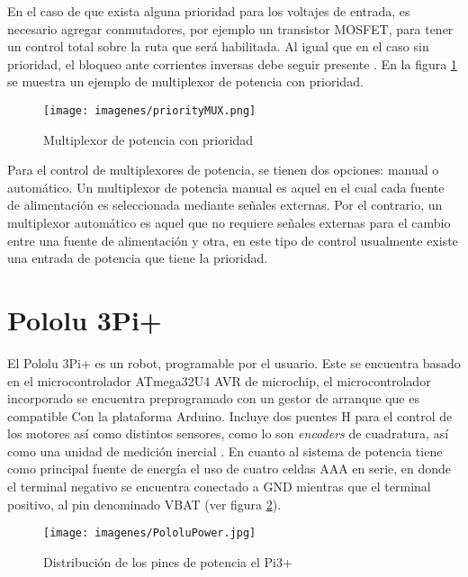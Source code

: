 En el caso de que exista alguna prioridad para los voltajes de entrada, es necesario agregar conmutadores,
por ejemplo un transistor MOSFET, para tener un control total sobre la ruta que será habilitada. Al igual que
en el caso sin prioridad, el bloqueo ante corrientes inversas debe seguir presente \cite{triano_basics_2020}. En la figura \ref{fig:priorityMux} se muestra un ejemplo de multiplexor de potencia con prioridad.

\begin{figure}[H]
    \centering
    \texttt{[image: imagenes/priorityMUX.png]}
    \caption{Multiplexor de potencia con prioridad \cite{triano_basics_2020}}
    \label{fig:priorityMux}
\end{figure}

Para el control de multiplexores de potencia, se tienen dos opciones: manual o automático. Un multiplexor de
potencia manual es aquel en el cual cada fuente de alimentación es seleccionada mediante señales externas. Por el contrario, un multiplexor automático es aquel que no requiere señales externas para el cambio entre 
una fuente de alimentación y otra, en este tipo de control usualmente existe una entrada de potencia que 
tiene la prioridad.

\section{Pololu 3Pi+}

El Pololu 3Pi+ es un robot, programable por el usuario. Este se encuentra basado en el microcontrolador ATmega32U4 AVR
de microchip, el microcontrolador incorporado se encuentra preprogramado con un gestor de arranque que es compatible
 Con la plataforma Arduino. Incluye dos puentes H para el control de los motores así como distintos sensores, como lo 
 son \textit{encoders} de cuadratura, así como una unidad de medición inercial \cite{noauthor_pololu_nodate}. En cuanto 
 al sistema de potencia tiene como principal fuente de energía el uso de cuatro celdas AAA en serie, en donde el 
 terminal negativo se encuentra conectado a GND mientras que el terminal positivo, al pin denominado VBAT (ver figura
 \ref{fig:power}).

 \begin{figure}[H]
    \centering
    \texttt{[image: imagenes/PololuPower.jpg]}
    \caption{Distribución de los pines de potencia el Pi3+ \cite{noauthor_pololu_nodate}}
    \label{fig:power}
 \end{figure}

